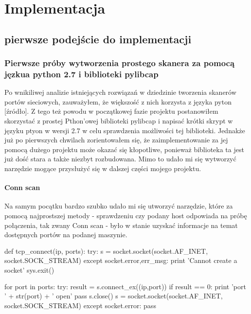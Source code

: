 \chapter{Implementacja}


\section{pierwsze podejście do implementacji}

\subsection{Pierwsze próby wytworzenia prostego skanera za pomocą jęzkua python 2.7 i biblioteki pylibcap}

Po wnikiliwej analizie istniejących rozwiązań w dziedzinie tworzenia skanerów portów sieciowych, zauważyłem, że większość z nich korzysta z języka pyton [źródło]. Z tego też powodu w początkowej fazie projektu postanowiłem skorzystać z prostej Pthon'owej biblioteki pylibcap i napisać krótki skrypt w języku ptyon w wersji 2.7 w celu sprawdzenia możliwości tej biblioteki. Jednakże już po pierwszych chwilach zorientowałem się, że zaimplementowanie za jej pomocą dużego projektu może okazać się kłopotliwe, ponieważ biblioteka ta jest już dość stara a także niezbyt rozbudowana. Mimo to udało mi się wytworzyć narzędzie mogące przysłużyć się w dalszej części mojego projektu.

\subsubsection{Conn scan}
Na samym pocątku bardzo szubko udało mi się utworzyć narzędzie, które za pomocą najprostszej metody - sprawdzeniu czy podany host odpowiada na próbę połączenia, tak zwany Conn scan - było w stanie uzyskać informacje na temat dostępnych portów na podanej maszynie. 


\begin{python}
def tcp_connect(ip, ports):
    try:
        s = socket.socket(socket.AF_INET, socket.SOCK_STREAM)
    except socket.error,err_msg:
      print 'Cannot create a socket'
      sys.exit()

    for port in ports:
        try:
            result = s.connect_ex((ip,port))
            if result == 0:
                print 'port ' + str(port) + ' open'
                pass
            s.close()
            s = socket.socket(socket.AF_INET, socket.SOCK_STREAM)
        except socket.error:
            pass
\end{python}



